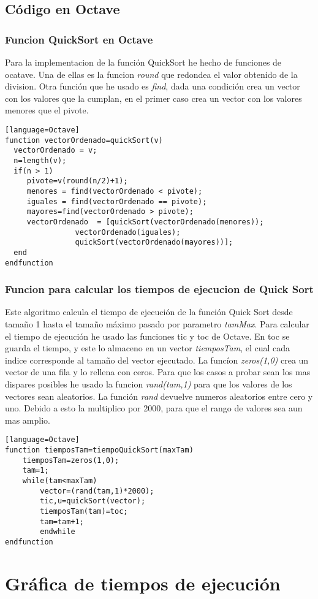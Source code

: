 \documentclass[a4,12pt]{article}
\begin{document}
\subsection{Código en Octave}
\subsubsection{Funcion QuickSort en Octave}
Para la implementacion de la función QuickSort he hecho de funciones de ocatave. Una de ellas es la funcion \emph{round} que redondea el valor obtenido de la division. Otra función que he usado es \emph{find}, dada una condición crea un vector con los valores que la cumplan, en el primer caso crea un vector con los valores menores que el pivote.
\bigskip %
\lstset{language=Octave}
\begin{lstlisting}[frame=single][language=Octave]
function vectorOrdenado=quickSort(v)     
  vectorOrdenado = v;
  n=length(v);
  if(n > 1)          
     pivote=v(round(n/2)+1);             
     menores = find(vectorOrdenado < pivote); 
     iguales = find(vectorOrdenado == pivote);
     mayores=find(vectorOrdenado > pivote);
     vectorOrdenado  = [quickSort(vectorOrdenado(menores));
     			vectorOrdenado(iguales); 
     			quickSort(vectorOrdenado(mayores))];
  end
endfunction
\end{lstlisting}
\subsubsection{Funcion para calcular los tiempos de ejecucion de Quick Sort}
Este algoritmo calcula el tiempo de ejecución de la función Quick Sort desde tamaño 1 hasta el tamaño máximo pasado por parametro \emph {tamMax}. Para calcular el tiempo de ejecución he usado las funciones tic y toc de Octave. En toc se guarda el tiempo, y este lo almaceno en un vector \emph{tiemposTam}, el cual cada indice corresponde al tamaño del vector ejecutado.
La funcíon \emph{zeros(1,0)} crea un vector de una fila y lo rellena con ceros.
Para que los casos a probar sean los mas dispares posibles he usado la funcion \emph{rand(tam,1)} para que los valores de los vectores sean aleatorios. La función \emph{rand} devuelve numeros aleatorios entre cero y uno. Debido a esto la multiplico por 2000, para que el rango de valores sea aun mas amplio.
\bigskip %
\lstset{language=Octave}
\begin{lstlisting}[frame=single][language=Octave]
function tiemposTam=tiempoQuickSort(maxTam)
	tiemposTam=zeros(1,0);
	tam=1;
	while(tam<maxTam)
		vector=(rand(tam,1)*2000);
		tic,u=quickSort(vector); 
		tiemposTam(tam)=toc;
		tam=tam+1;
		endwhile
endfunction

\end{lstlisting}
\subsubsection{}
\section{Gráfica de tiempos de ejecución}




\end{document}
